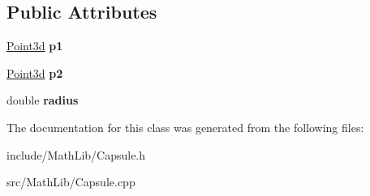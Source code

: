 \subsection*{Public Attributes}
\begin{DoxyCompactItemize}
\item 
\hypertarget{classCartWheel_1_1Math_1_1Capsule_a69244b7bc7a193d2c8bd9162a9ec1aa6}{
\hyperlink{classCartWheel_1_1Math_1_1Point3d}{Point3d} {\bfseries p1}}
\label{classCartWheel_1_1Math_1_1Capsule_a69244b7bc7a193d2c8bd9162a9ec1aa6}

\item 
\hypertarget{classCartWheel_1_1Math_1_1Capsule_a528705ab0e3c1aea3c9841be211e6978}{
\hyperlink{classCartWheel_1_1Math_1_1Point3d}{Point3d} {\bfseries p2}}
\label{classCartWheel_1_1Math_1_1Capsule_a528705ab0e3c1aea3c9841be211e6978}

\item 
\hypertarget{classCartWheel_1_1Math_1_1Capsule_afecdba3a90cceb6279bd1c3715fd5cdc}{
double {\bfseries radius}}
\label{classCartWheel_1_1Math_1_1Capsule_afecdba3a90cceb6279bd1c3715fd5cdc}

\end{DoxyCompactItemize}


The documentation for this class was generated from the following files:\begin{DoxyCompactItemize}
\item 
include/MathLib/Capsule.h\item 
src/MathLib/Capsule.cpp\end{DoxyCompactItemize}
